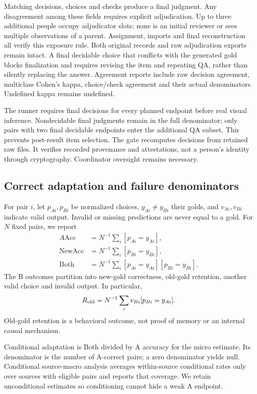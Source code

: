 \documentclass[10pt,twocolumn,letterpaper]{article}
\begin{document}
Matching decisions, choices and checks produce a final judgment.
Any disagreement among these fields requires explicit adjudication.
Up to three additional people occupy adjudicator slots; none is an
initial reviewer or sees multiple observations of a parent. Assignment,
imports and final reconstruction all verify this exposure rule.
Both original records and raw adjudication exports remain intact.
A final decidable choice that conflicts with the generated gold blocks
finalization and requires revising the item and repeating QA, rather
than silently replacing the answer. Agreement reports include raw
decision agreement, multiclass Cohen's kappa, choice/check agreement
and their actual denominators. Undefined kappa remains undefined.

The runner requires final decisions for every planned endpoint before
real visual inference. Nondecidable final judgments remain in the full
denominator; only pairs with two final decidable endpoints enter the
additional QA subset. This prevents post-result item selection.
The gate recomputes decisions from retained raw files. It verifies
recorded provenance and attestations, not a person's identity through
cryptography. Coordinator oversight remains necessary.

\subsection{Correct adaptation and failure denominators}
For pair $i$, let $p_{Ai},p_{Bi}$ be normalized choices, $y_{Ai}\ne
y_{Bi}$ their golds, and $v_{Ai},v_{Bi}$ indicate valid output.
Invalid or missing predictions are never equal to a gold. For
$N$ fixed pairs, we report
\begin{align}
A\mathrm{Acc}&=N^{-1}\sum_i[p_{Ai}=y_{Ai}],\\
\mathrm{NewAcc}&=N^{-1}\sum_i[p_{Bi}=y_{Bi}],\\
\mathrm{Both}&=N^{-1}\sum_i[p_{Ai}=y_{Ai}][p_{Bi}=y_{Bi}].
\end{align}
The B outcomes partition into new-gold correctness, old-gold retention,
another valid choice and invalid output. In particular,
\begin{equation}
R_{\rm old}=N^{-1}\sum_i v_{Bi}[p_{Bi}=y_{Ai}].
\end{equation}
Old-gold retention is a behavioral outcome, not proof of memory or an
internal causal mechanism.

Conditional adaptation is Both divided by A accuracy for the micro
estimate. Its denominator is the number of A-correct pairs; a zero
denominator yields null. Conditional source-macro analysis averages
within-source conditional rates only over sources with eligible pairs
and reports that coverage. We retain unconditional estimates so
conditioning cannot hide a weak A endpoint.
\end{document}
